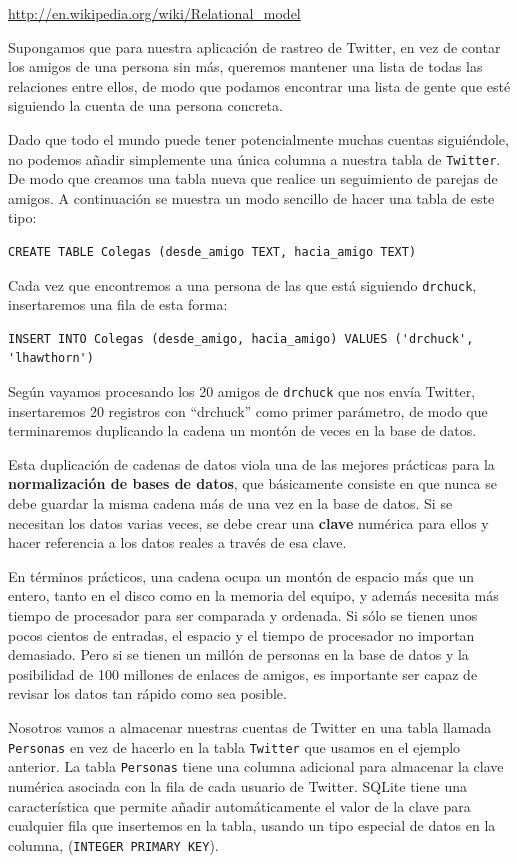 \url{http://en.wikipedia.org/wiki/Relational_model}

Supongamos que para nuestra aplicación de rastreo de Twitter, en vez de contar
los amigos de una persona sin más, queremos mantener una lista de
todas las relaciones entre ellos, de modo que podamos encontrar una lista de
gente que esté siguiendo la cuenta de una persona concreta.

Dado que todo el mundo puede tener potencialmente muchas cuentas siguiéndole,
no podemos añadir simplemente una única columna a nuestra tabla de {\tt Twitter}.
De modo que creamos una tabla nueva que realice un seguimiento de parejas de amigos.
A continuación se muestra un modo sencillo de hacer una tabla de este tipo:

\beforeverb
\begin{verbatim}
CREATE TABLE Colegas (desde_amigo TEXT, hacia_amigo TEXT)
\end{verbatim}
\afterverb
%
Cada vez que encontremos a una persona de las que está siguiendo {\tt drchuck},
insertaremos una fila de esta forma:

\beforeverb
\begin{verbatim}
INSERT INTO Colegas (desde_amigo, hacia_amigo) VALUES ('drchuck', 'lhawthorn')
\end{verbatim}
\afterverb
%
Según vayamos procesando los 20 amigos de {\tt drchuck}
que nos envía Twitter, insertaremos 20 registros con ``drchuck''
como primer parámetro, de modo que terminaremos duplicando la
cadena un montón de veces en la base de datos.

Esta duplicación de cadenas de datos viola una de las mejores prácticas
para la {\bf normalización de bases de datos}, que básicamente consiste en
que nunca se debe guardar la misma cadena más de una vez en la base de datos.
Si se necesitan los datos varias veces, se debe crear una
{\bf clave} numérica para ellos y hacer referencia a los datos reales
a través de esa clave.

En términos prácticos, una cadena ocupa un montón
de espacio más que un entero, tanto en el disco como en
la memoria del equipo, y además necesita más tiempo de procesador
para ser comparada y ordenada. Si sólo se tienen unos pocos cientos de entradas,
el espacio y el tiempo de procesador no importan demasiado. Pero si se tienen
un millón de personas en la base de datos y la posibilidad de 100 millones
de enlaces de amigos, es importante ser capaz de revisar los datos tan rápido
como sea posible.

Nosotros vamos a almacenar nuestras cuentas de Twitter en una tabla llamada {\tt Personas}
en vez de hacerlo en la tabla {\tt Twitter} que usamos en el ejemplo anterior.
La tabla {\tt Personas} tiene una columna adicional
para almacenar la clave numérica asociada con la
fila de cada usuario de Twitter.
SQLite tiene una característica que permite añadir automáticamente el valor de la clave
para cualquier fila que insertemos en la tabla, usando un tipo especial de
datos en la columna, ({\tt INTEGER PRIMARY KEY}).

